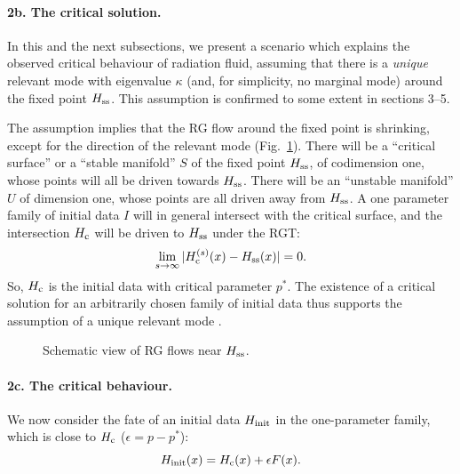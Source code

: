 
\paragraph*{2b. The critical solution. }

In this and the next subsections, we present a scenario which
explains the observed critical behaviour of radiation fluid, assuming
that there is a {\em unique} relevant mode with eigenvalue $\kappa$
(and, for simplicity, no marginal mode)
around the fixed point $H_{\rm ss}$.  This assumption is
confirmed to some extent in sections 3--5.


The assumption implies that the RG flow around the fixed point
is shrinking, except for the direction of the relevant mode (Fig.~\ref{fig0}).
There will be a ``critical surface'' or a ``stable manifold'' $S$ of the
fixed point $H_{\rm ss}$, of codimension one,
whose points will all be driven towards $H_{\rm ss}$.
There will be an ``unstable manifold'' $U$ of dimension one, whose
points are all driven away from $H_{\rm ss}$.
A one parameter family of initial data $I$ will in general intersect
with the critical surface,  and the intersection $H_{\rm c}$
will be driven to $H_{\rm ss}$ under the RGT:
\begin{equation}
          \lim_{s\rightarrow\infty}
      | H_{\rm c}^{(s)}(x) -  H_{\rm ss}(x) | =0 .
        \label{eq:crit}
\end{equation}
So, $H_{\rm c}$ is the initial data with critical parameter $p^*$.
The existence of a critical solution for an arbitrarily chosen
family of initial data thus supports the assumption of a unique
relevant mode \cite{footnote0}.

%
\begin{figure}
\begin{center}
{ }
\end{center}
\caption{Schematic view of RG flows near $H_{\rm ss}$. }
\label{fig0}
\end{figure}
%



\paragraph*{2c. The critical behaviour. }
We now consider the fate of an initial data $H_{\rm init}$ in
the one-parameter family, which is  close to $H_{\rm c}$
 ($\epsilon = p - p^*$):
\begin{equation}
        H_{\rm init}(x) = H_{\rm c}(x) + \epsilon F(x) .
\end{equation}

